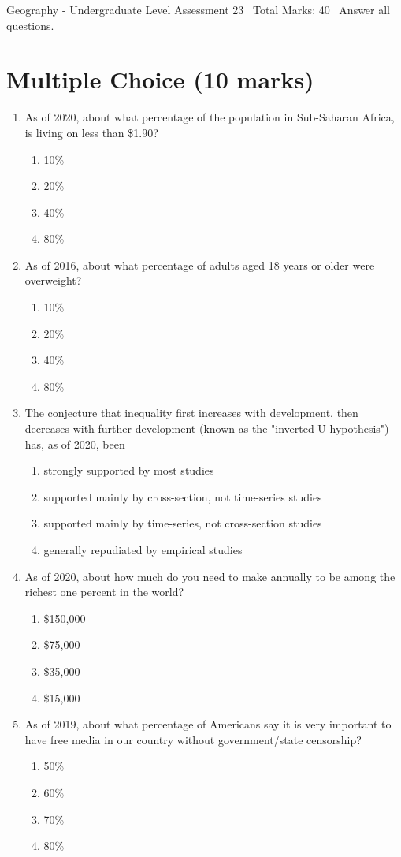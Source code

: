 \documentclass[12pt]{article}
\begin{document}
\begin{center}
Geography - Undergraduate Level Assessment 23 \
Total Marks: 40 \
Answer all questions.
\end{center}

\section*{Multiple Choice (10 marks)}
\begin{enumerate}[label=\arabic*.]
\item As of 2020, about what percentage of the population in Sub-Saharan Africa, is living on less than \$1.90?
\begin{enumerate}[label=(\alph*)]
    \item 10\%
    \item 20\%
    \item 40\%
    \item 80\%
\end{enumerate}
\item As of 2016, about what percentage of adults aged 18 years or older were overweight?
\begin{enumerate}[label=(\alph*)]
    \item 10\%
    \item 20\%
    \item 40\%
    \item 80\%
\end{enumerate}
\item The conjecture that inequality first increases with development, then decreases with further development (known as the "inverted U hypothesis") has, as of 2020, been
\begin{enumerate}[label=(\alph*)]
    \item strongly supported by most studies
    \item supported mainly by cross-section, not time-series studies
    \item supported mainly by time-series, not cross-section studies
    \item generally repudiated by empirical studies
\end{enumerate}
\item As of 2020, about how much do you need to make annually to be among the richest one percent in the world?
\begin{enumerate}[label=(\alph*)]
    \item \$150,000
    \item \$75,000
    \item \$35,000
    \item \$15,000
\end{enumerate}
\item As of 2019, about what percentage of Americans say it is very important to have free media in our country without government/state censorship?
\begin{enumerate}[label=(\alph*)]
    \item 50\%
    \item 60\%
    \item 70\%
    \item 80\%
\end{enumerate}
\end{enumerate}
\end{document}
